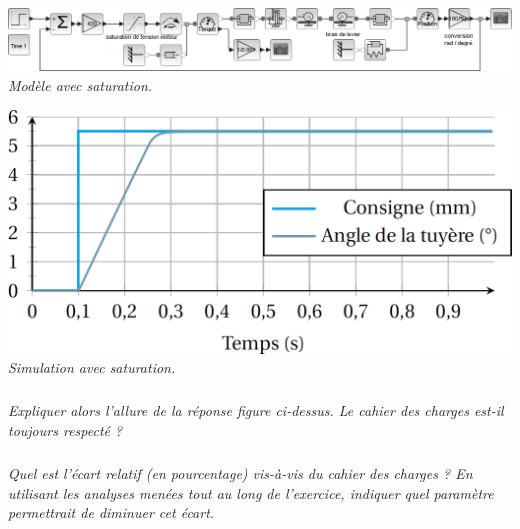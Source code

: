 \documentclass[10pt,fleqn]{article} %
\begin{document}
\begin{multicols}{2}
 \begin{center}
\includegraphics[width=.95\linewidth]{images/fig_10}
\textit{Modèle avec saturation.}
\end{center}



 \begin{center}
\includegraphics[width=.95\linewidth]{images/fig_11}
\textit{Simulation avec saturation.}
\end{center}

%





\subparagraph{}\textit{Expliquer alors l'allure de la réponse figure ci-dessus.%
Le cahier des charges est-il toujours respecté ?}

\subparagraph{}\textit{Quel est l'écart relatif (en pourcentage) vis-à-vis du cahier des charges ?  En utilisant les analyses menées tout au long de l'exercice, indiquer quel paramètre permettrait de diminuer cet écart.}






\end{multicols}
\end{document}
